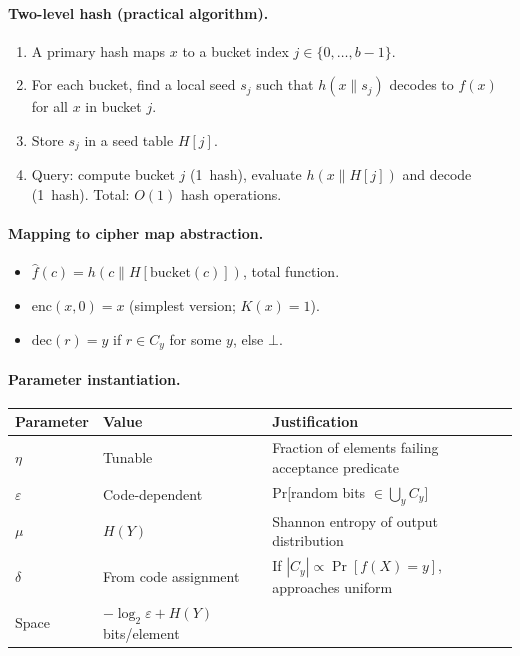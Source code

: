 \documentclass[11pt]{article}
\theoremstyle{definition}
\theoremstyle{plain}
\theoremstyle{remark}
\newcommand{\fhat}{\hat{f}}
\newcommand{\enc}{\mathrm{enc}}
\newcommand{\dec}{\mathrm{dec}}
\begin{document}
\paragraph{Two-level hash (practical algorithm).}
\begin{enumerate}
\item A primary hash maps $x$ to a bucket index $j \in \{0, \ldots, b-1\}$.
\item For each bucket, find a local seed $s_j$ such that $h(x \| s_j)$
    decodes to $f(x)$ for all $x$ in bucket $j$.
\item Store $s_j$ in a seed table $H[j]$.
\item Query: compute bucket $j$ (1~hash), evaluate $h(x \| H[j])$ and
    decode (1~hash).  Total: $O(1)$ hash operations.
\end{enumerate}

\paragraph{Mapping to cipher map abstraction.}
\begin{itemize}
\item $\fhat(c) = h(c \| H[\mathrm{bucket}(c)])$, total function.
\item $\enc(x, 0) = x$ (simplest version; $K(x)=1$).
\item $\dec(r) = y$ if $r \in C_y$ for some $y$, else $\bot$.
\end{itemize}

\paragraph{Parameter instantiation.}
\begin{center}
\begin{tabular}{@{}lll@{}}
\toprule
Parameter & Value & Justification \\
\midrule
$\eta$ & Tunable & Fraction of elements failing acceptance predicate \\
$\varepsilon$ & Code-dependent & Pr[random bits $\in \bigcup_y C_y$] \\
$\mu$ & $H(Y)$ & Shannon entropy of output distribution \\
$\delta$ & From code assignment & If $|C_y| \propto \Pr[f(X)=y]$,
    approaches uniform \\
Space & $-\log_2\varepsilon + H(Y)$ bits/element & \\
\bottomrule
\end{tabular}
\end{center}
\end{document}
